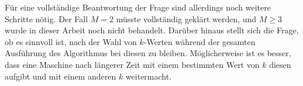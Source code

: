 \documentclass[a4paper, 11pt, ngerman]{article}
\theoremstyle{definition}
\theoremstyle{plain}
\theoremstyle{remark}
\begin{document}
Für eine vollständige Beantwortung der Frage sind allerdings noch weitere Schritte nötig. Der Fall $M = 2$ müsste vollständig geklärt werden, und $M \ge 3$ wurde in dieser Arbeit noch nicht behandelt. Darüber hinaus stellt sich die Frage, ob es sinnvoll ist, nach der Wahl von $k$-Werten während der gesamten Ausführung des Algorithmus bei diesen zu bleiben. Möglicherweise ist es besser, dass eine Maschine nach längerer Zeit mit einem bestimmten Wert von $k$ diesen aufgibt und mit einem anderen $k$ weitermacht.

\newpage
\printbibliography
\end{document}
